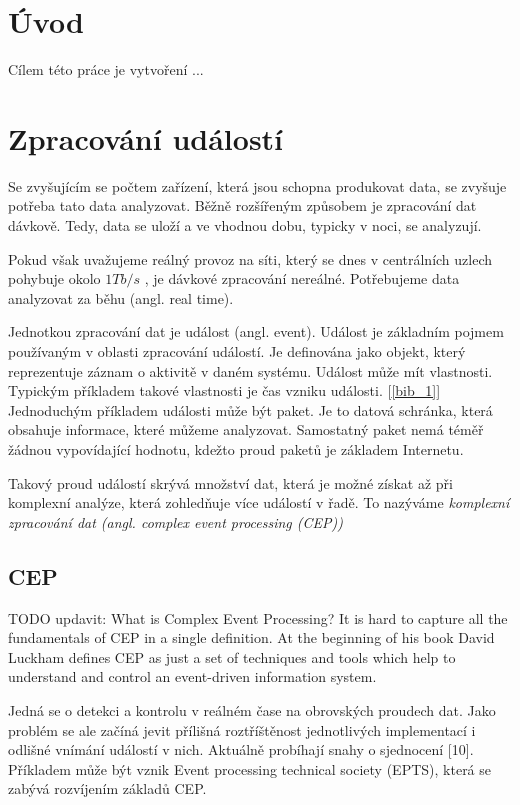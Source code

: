 \documentclass[
  digital, %
  table,   %
  nolof,     %
  nolot,     %
  twoside,
  nocover,
  monochrome,
  12pt
]{fithesis3}
\begin{document}
\chapter{Úvod}
Cílem této práce je vytvoření  ...

\chapter{Zpracování událostí}
Se zvyšujícím se počtem zařízení, která jsou schopna produkovat data, se zvyšuje potřeba tato data analyzovat. Běžně rozšířeným způsobem je zpracování dat dávkově. Tedy, data se uloží a ve vhodnou dobu, typicky v noci, se analyzují.

Pokud však uvažujeme reálný provoz na síti, který se dnes v centrálních uzlech pohybuje okolo $1 Tb/s$ 
, je dávkové zpracování nereálné. Potřebujeme data analyzovat za běhu (angl. real time).

Jednotkou zpracování dat je událost (angl. event). Událost je základním pojmem používaným v oblasti zpracování událostí. Je definována jako objekt, který reprezentuje záznam o aktivitě v daném systému. Událost může mít vlastnosti. Typickým příkladem takové vlastnosti je čas vzniku události. [\ref{bib_1}] Jednoduchým příkladem události může být paket. Je to datová schránka, která obsahuje informace, které můžeme analyzovat. Samostatný paket nemá téměř žádnou vypovídající hodnotu, kdežto proud paketů je základem Internetu.

Takový proud událostí skrývá množství dat, která je možné získat až při komplexní analýze, která zohledňuje více událostí v řadě. To nazýváme \textit{komplexní zpracování dat (angl. complex event processing (CEP))}

\section{CEP}

TODO updavit:
What is Complex Event Processing? It is hard to capture all the fundamentals
of CEP in a single definition. At the beginning of his book David Luckham
defines CEP as just a set of techniques and tools which help to understand
and control an event-driven information system.

Jedná se o detekci a kontrolu v reálném čase na obrovských proudech dat. Jako problém se ale
začíná jevit přílišná roztříštěnost jednotlivých implementací i odlišné vnímání událostí v
nich. Aktuálně probíhají snahy o sjednocení [10]. Příkladem může být vznik Event
processing technical society (EPTS), která se zabývá rozvíjením základů CEP.
\end{document}
